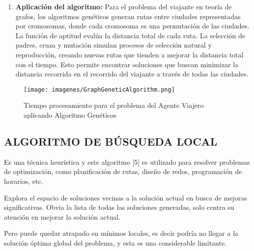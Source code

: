 \documentclass{article}
\begin{document}
    \begin{enumerate}
        \item \textbf{Aplicación del algoritmo:} Para el problema del viajante en teoría de grafos, los algoritmos genéticos generan rutas entre ciudades representadas por cromosomas, donde cada cromosoma es una permutación de las ciudades. La función de aptitud evalúa la distancia total de cada ruta. La selección de padres, cruza y mutación simulan procesos de selección natural y reproducción, creando nuevas rutas que tienden a mejorar la distancia total con el tiempo. Esto permite encontrar soluciones que buscan minimizar la distancia recorrida en el recorrido del viajante a través de todas las ciudades.
    \end{enumerate}

\begin{figure}[H]
    \centering
    \texttt{[image: imagenes/GraphGeneticAlgorithm.png]}
    \caption{\label{fig:GraphGeneticAlgorithm}Tiempo procesamiento para el problema del Agente Viajero aplicando Algoritmo Genéticos}
\end{figure}


\subsection{ALGORITMO DE BÚSQUEDA LOCAL}
Es una técnica heurística y este algoritmo [5] es utilizado para resolver problemas de optimización, como planificación de rutas, diseño de redes, programación de horarios, etc.

Explora el espacio de soluciones vecinas a la solución actual en busca de mejoras significativas. Obvia la lista de todas las soluciones generadas, solo centra su atención en mejorar la solución actual.

Pero puede quedar atrapado en mínimos locales, es decir podría no llegar a la solución óptima global del problema, y esta es una considerable limitante.
\end{document}
